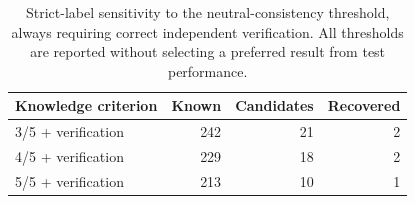 \begin{table}[t]
\centering
\small
\begin{tabular}{@{}lrrr@{}}
\toprule
Knowledge criterion & Known & Candidates & Recovered \\
\midrule
3/5 + verification & 242 & 21 & 2 \\
4/5 + verification & 229 & 18 & 2 \\
5/5 + verification & 213 & 10 & 1 \\
\bottomrule
\end{tabular}
\caption{Strict-label sensitivity to the neutral-consistency threshold, always requiring correct independent verification. All thresholds are reported without selecting a preferred result from test performance.}
\label{tab:knowledge}
\end{table}
